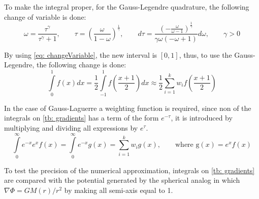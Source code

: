 		To make the integral proper, for the Gauss-Legendre quadrature, the following change of variable is done:
		\begin{equation}\label{eq: changeVariable}
			\omega = \dfrac{\tau^\gamma}{\tau^\gamma + 1}, \qquad \tau = \left(\frac{\omega}{1-\omega}\right)^{\frac{1}{\gamma}}, \qquad d\tau = \dfrac{\left(- \frac{\omega}{\omega - 1}\right)^{\frac{1}{\gamma}}}{\gamma \omega \left(- \omega + 1\right)} d\omega, \qquad \gamma > 0
		\end{equation} 
		
		By using \autoref{eq: changeVariable}, the new interval is $[0, 1]$, thus, to use the Gauss-Legendre, the following change is done:
		\begin{equation}
			\int\limits_{0}^{1}f(x)dx = \dfrac{1}{2}\int\limits_{-1}^{1}f\left(\dfrac{x + 1}{2}\right)dx \approx \dfrac{1}{2}\sum_{i = 1}^{k}w_if\left(\dfrac{x + 1}{2}\right)
		\end{equation}
		
		In the case of Gauss-Laguerre a weighting function is required, since non of the integrals on \autoref{tb: gradients} has a term of the form $e^{-\tau}$, it is introduced by multiplying and dividing all expressions by $e^{\tau}$.
		\begin{equation}
			\int\limits_{0}^{\infty}e^{-x}e^{x}f(x) = \int\limits_{0}^{\infty}e^{-x}g(x) = \sum_{i = 1}^{k}w_i g(x), \qquad \text{where g$(x) = e^xf(x)$}
		\end{equation}
		
		To test the precision of the numerical approximation, integrals on \autoref{tb: gradients} are compared with the potential generated by the spherical analog in which $\nabla\Phi = GM(r)/r^2$ by making all semi-axis equal to 1.
		
